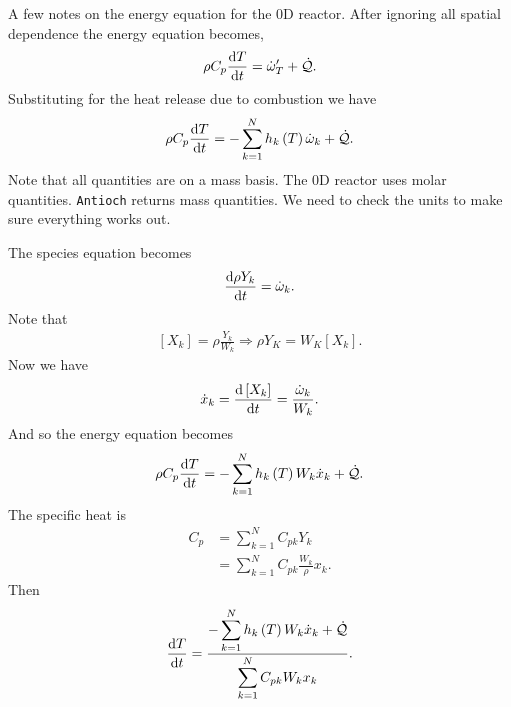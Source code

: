 


A few notes on the energy equation for the 0D reactor.  After ignoring all spatial
dependence the energy equation becomes,
\begin{align}
  \rho C_{p}\frac{\mathrm{d} T}{\mathrm{d} t} = \dot{\omega}_{T}^{\prime} + \dot{\mathcal{Q}}.
\end{align}
Substituting for the heat release due to combustion we have
\begin{align}
  \rho C_{p}\frac{\mathrm{d} T}{\mathrm{d} t} = -\sum_{k=1}^{N}h_{k}\left(T\right)\dot{\omega}_{k} + \dot{\mathcal{Q}}.
\end{align}
Note that all quantities are on a mass basis.  The 0D reactor uses molar quantities.
\texttt{Antioch} returns mass quantities.  We need to check the units to make sure 
everything works out.

The species equation becomes
\begin{align}
  \frac{\mathrm{d} \rho Y_{k}}{\mathrm{d} t} = \dot{\omega}_{k}.
\end{align}
Note that
\begin{align}
  \left[X_{k}\right] = \rho \frac{Y_{k}}{W_{k}} \Rightarrow \rho Y_{K} = W_{K}\left[X_{k}\right].
\end{align}
Now we have
\begin{align}
  \dot{x}_{k} = \frac{\mathrm{d} \left[X_{k}\right]}{\mathrm{d} t} = \frac{\dot{\omega}_{k}}{W_{k}}.
\end{align}
And so the energy equation becomes
\begin{align}
  \rho C_{p}\frac{\mathrm{d} T}{\mathrm{d} t} = - \sum_{k=1}^{N}h_{k}\left(T\right)W_{k}\dot{x}_{k} + \dot{\mathcal{Q}}.
\end{align}
The specific heat is
\begin{align}
  C_{p} &= \sum_{k=1}^{N}C_{pk}Y_{k} \\
        &= \sum_{k=1}^{N}C_{pk}\frac{W_{k}}{\rho}x_{k}.
\end{align}
Then
\begin{align}
  \frac{\mathrm{d} T}{\mathrm{d} t} = \frac{\displaystyle -\sum_{k=1}^{N}h_{k}\left(T\right)W_{k}\dot{x}_{k} + \dot{\mathcal{Q}}}{\displaystyle \sum_{k=1}^{N}C_{pk}W_{k}x_{k}}.
\end{align}

